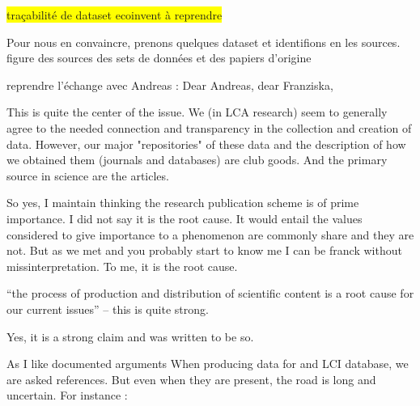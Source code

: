 \begin{center}\colorbox{yellow}{traçabilité de dataset ecoinvent à reprendre}\end{center}
Pour nous en convaincre, prenons quelques dataset et identifions en les sources.
figure des sources des sets de données et des papiers d'origine

reprendre l'échange avec Andreas :
Dear Andreas, dear Franziska,

This is quite the center of the issue. We (in LCA research) seem to generally agree to the needed connection and transparency in the collection and creation of data. However, our major "repositories" of these data and the description of how we obtained them (journals and databases) are club goods.
And the primary source in science are the articles.

So yes, I maintain thinking the research publication scheme is of prime importance. I did not say it is the root cause. It would entail the values considered to give importance to a phenomenon are commonly share and they are not. But as we met and you probably start to know me I can be franck without missinterpretation. To me, it is the root cause.

“the process of production and distribution of scientific content is a root cause for our current issues” – this is quite strong.

Yes, it is a strong claim and was written to be so.

As I like documented arguments
When producing data for and LCI database, we are asked references. But even when they are present, the road is long and uncertain.
For instance :

